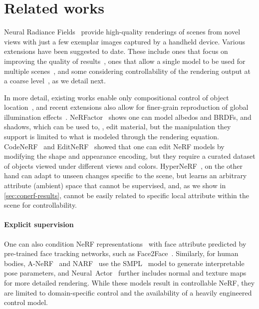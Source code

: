 \section{Related works}
  \label{sec:conerf-related}
  Neural Radiance Fields~\cite{mildenhall2020nerf} provide high-quality
  renderings of scenes from novel views with just a few exemplar images
  captured by a handheld device.
  Various extensions have been suggested to date.
  These include ones that focus on improving the quality of
  results~\cite{martin2021nerf, park2020deformable, park2021hypernerf,
  zhang2020nerf++}, ones that allow a single model to be used for multiple
  scenes~\cite{schwarz2020graf, trevithick2020grf}, and some considering
  controllability of the rendering output at a coarse
  level~\cite{guo2020object, yu2021unsupervised, liu2021editing,
  yang2021learning, xie2021fig, zhang2021nerfactor}, as we detail next.

  In more detail, existing works enable only compositional control of object
  location~\cite{yang2021learning,yu2021unsupervised}, and recent extensions
  also allow for finer-grain reproduction of global illumination
  effects~\cite{guo2020object}.
  NeRFactor~\cite{zhang2021nerfactor} shows one can model albedos and BRDFs,
  and shadows, which can be used to, \eg, edit material, but the manipulation
  they support is limited to what is modeled through the rendering equation.
  CodeNeRF~\cite{jang2021codenerf} and EditNeRF~\cite{liu2021editing} showed
  that one can edit NeRF models by modifying the shape and appearance
  encoding, but they require a curated dataset of objects viewed under
  different views and colors.
  HyperNeRF~\cite{park2021hypernerf}, on the other hand can adapt to unseen
  changes specific to the scene, but learns an arbitrary attribute (ambient)
  space that cannot be supervised, and, as we show in
  \cref{sec:conerf-results}, cannot be easily related to specific local
  attribute within the scene for controllability.

  \paragraph{Explicit supervision}
    One can also condition NeRF representations~\cite{gafni2021dynamic} with
    face attribute predicted by pre-trained face tracking networks, such as
    Face2Face~\cite{thies2016face2face}.
    Similarly, for human bodies, A-NeRF~\cite{su2021anerf} and
    NARF~\cite{noguchi2021neural} use the SMPL~\cite{loper2015smpl} model to
    generate interpretable pose parameters, and
    Neural~Actor~\cite{liu2021neural} further includes normal and texture maps
    for more detailed rendering.
    While these models result in controllable NeRF, they are limited to
    domain-specific control and the availability of a heavily engineered
    control model.

